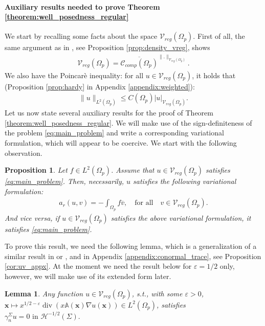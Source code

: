 \documentclass[report]{elsarticle}
\newtheorem{proposition}[theorem]{Proposition}
\newtheorem{lemma}[theorem]{Lemma}
\numberwithin{theorem}{section}
\renewcommand{\vec}[1]{\mathbf{#1}}
\newcommand{\re}{\varepsilon}
\begin{document}
\paragraph{Auxiliary results needed to prove Theorem \ref{theorem:well_posedness_regular}}
We start by recalling some facts about the space $\mathcal{V}_{reg}(\Omega_p)$. First of all, the same argument as in \cite[Theorem 1.1]{grisvard}, see Proposition \ref{prop:density_vreg}, shows 
\begin{align}
	\label{eq:vreg_density}
	\mathcal{V}_{reg}(\Omega_p)=\overline{\mathcal{C}_{comp}(\Omega_p)}^{\|.\|_{\mathcal{V}_{reg}(\Omega_p)}}.
\end{align}
We also have the Poincar\`e inequality: for all $u\in \mathcal{V}_{reg}(\Omega_p)$, it holds that (Proposition \ref{prop:hardy} in Appendix \ref{appendix:weighted}):
\begin{align}
	\label{eq:poincare_vreg}
	\|u\|_{L^2(\Omega_p)}\leq C(\Omega_p)|u|_{\mathcal{V}_{reg}(\Omega_p)}.
\end{align}
Let us now state several auxiliary results for the proof of Theorem \ref{theorem:well_posedness_regular}. We will make use of the sign-definiteness of the problem \eqref{eq:main_problem} and write a corresponding variational formulation, which will appear to be coercive. We start with the following observation. 
\begin{proposition}
	\label{prop:rp_var}
	Let $f\in L^2(\Omega_p)$. Assume that $u\in \mathcal{V}_{reg}(\Omega_p)$ satisfies \eqref{eq:main_problem}. Then, necessarily, $u$ satisfies the following variational formulation: 
	\begin{align}
		\label{eq:var_form1}
		a_r(u, v)=-\int_{\Omega_p}f\overline{v}, \quad \text{for all} \quad v\in \mathcal{V}_{reg}(\Omega_p). 
	\end{align}
	And vice versa, if $u\in \mathcal{V}_{reg}(\Omega_p)$ satisfies the above variational formulation, it satisfies \eqref{eq:main_problem}. 
\end{proposition}
To prove this result, we need the following lemma, which is a generalization of a similar result in  \cite[p.70]{nicolopoulos_phd} or \cite[Section 1.1]{nicolopoulos}, and in Appendix \ref{appendix:conormal_trace}, see Proposition \ref{cor:uv_appx}. At the moment we need the result below for $\re=1/2$ only, however, we will make use of its extended form later.
\begin{lemma}
	\label{cor:uv}
	Any function $u\in \mathcal{V}_{reg}(\Omega_p)$, s.t., with some $\re>0$, $\vec{x}\mapsto x^{1/2-\varepsilon}\operatorname{div}(x\mathbb{A}(\vec{x})\nabla u(\vec{x}))\in L^2(\Omega_p)$, satisfies $
	\gamma_n^{\Sigma}u=0 \text{ in }\mathcal{H}^{-1/2}(\Sigma).$
\end{lemma}
\end{document}
